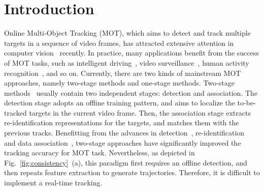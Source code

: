 \documentclass[acmsmall]{acmart}
\begin{document}
\section{Introduction}
Online Multi-Object Tracking (MOT){, which aims to detect and track multiple targets in a sequence of video frames,} has attracted extensive attention in computer vision~\cite{an2021multitarget,RN1215,mahmoudi2019multi} {recently}. 
In practice, many applications benefit from the {success} of MOT tasks, such as intelligent driving~\cite{auto_driving}, video surveillance~\cite{deep_sort}, human activity recognition~\cite{mot16}{, and so on}. 
Currently, {there are} two kinds of mainstream MOT approaches, namely two-stage methods and one-stage methods. 
Two-stage methods~\cite{fang2018recurrent,nonlocal_association,poi} {usually} contain two independent stages{: detection and association}. 
The detection stage {adopts an offline training pattern, and aims to localize} the to-be-tracked targets in the current video frame. 
{Then,} the association stage extracts re-identification representations for the targets,
and matches them with the previous tracks. 
{Benefitting from the advances in detection~\cite{faster,point,redmon2018yolov3}, re-identification~\cite{k_reciprocal,expanded_re} and data association~\cite{nonlocal_association}, two-stage approaches have significantly improved the tracking accuracy for MOT task.}
Nevertheless, {as depicted in Fig.~\ref{fig:consistency}~(a), this paradigm first requires an offline detection, and then repeats feature extraction to generate trajectories.
Therefore, it is difficult to implement a real-time tracking.
}
\end{document}
